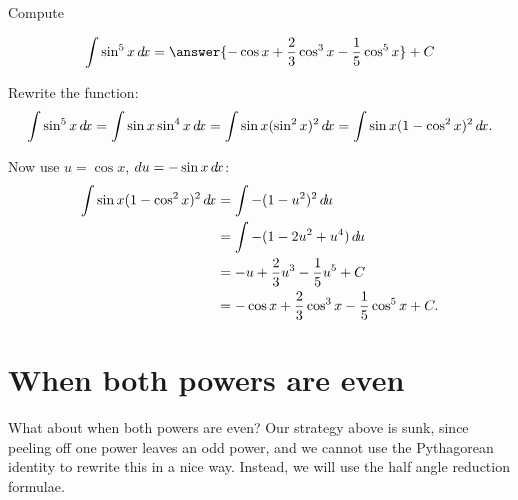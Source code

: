 \documentclass{ximera}
\begin{document}
\begin{example}
Compute

\[
\int \sin^5 x \d x = \answer{-\cos x+\frac{2}{3}\cos^3 x-\frac{1}{5}\cos^5x} + C
\]

\begin{hint}
Rewrite the function:
\[
  \int \sin^5 x\d x=\int \sin x \sin^4 x\d x=
  \int \sin x (\sin^2 x)^2\d x=
  \int \sin x (1-\cos^2 x)^2\d x.
\]
\end{hint}
\begin{hint}
Now use $u=\cos x$, $du=-\sin x\mathop{}\!d\! x$:
\begin{align*}
  \int \sin x (1-\cos^2 x)^2\mathop{}\!d\! x&=\int -(1-u^2)^2\mathop{}\!d\! u \\
  &=\int -(1-2u^2+u^4)\mathop{}\!d\! u \\
  &=-u+{2\over3}u^3-{1\over5}u^5+C \\
  &=-\cos x+{2\over3}\cos^3 x-{1\over5}\cos^5x+C. 
\end{align*}
\end{hint}

\end{example}

\section{When both powers are even}

What about when both powers are even?  Our strategy above is sunk, since peeling off one power leaves an odd power, and we cannot use the Pythagorean identity to rewrite this in a nice way.  Instead, we will use the half angle reduction formulae.
\end{document}
